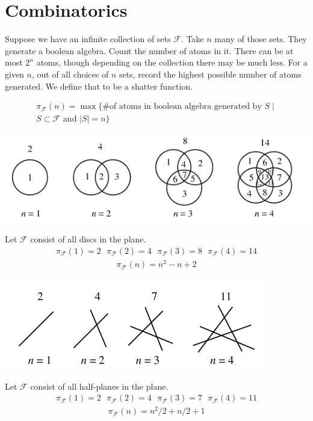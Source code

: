 \documentclass{amsart}
\newcommand{\F}{\mathcal F}
\begin{document}
\section{Combinatorics}

Suppose we have an infinite collection of sets $\F$.
Take $n$ many of those sets.
They generate a boolean algebra.
Count the number of atoms in it.
There can be at most $2^n$ atoms, though depending on the collection there may be much less.
For a given $n$, out of all choices of $n$ sets, record the highest possible number of atoms generated.
We define that to be a shatter function.

\begin{Definition}
	\begin{align*}
		\pi_\F(n) = \max \{ \text {\# of atoms in boolean algebra generated by $S$} \mid  \\ S \subset \F \text{ and } |S| = n\}
	\end{align*}
\end{Definition}

\includegraphics[scale=0.75]{circle.png}
\begin{Example}
	Let $\F$ consist of all discs in the plane.
	\begin{align*}
		\pi_\F(1) = 2 \ \ \  \pi_\F(2) = 4 \ \ \  \pi_\F(3) = 8  \ \ \ \pi_\F(4) = 14
	\end{align*}
	\begin{align*}
		\pi_\F(n) = n^2 - n + 2
	\end{align*}
\end{Example}

\includegraphics[scale=0.75]{lines.png}
\begin{Example}
	Let $\F$ consist of all half-planes in the plane.
	\begin{align*}
		\pi_\F(1) = 2 \ \ \  \pi_\F(2) = 4 \ \ \  \pi_\F(3) = 7  \ \ \ \pi_\F(4) = 11
	\end{align*}
	\begin{align*}
		\pi_\F(n) = n^2/2 + n/2 + 1
	\end{align*}
\end{Example}
\end{document}
